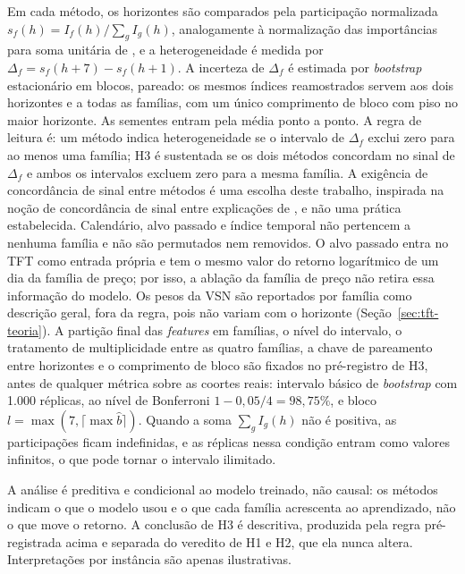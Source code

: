 Em cada método, os horizontes são comparados pela participação normalizada \(s_f(h) = I_f(h) / \sum_g I_g(h)\), analogamente à normalização das importâncias para soma unitária de , e a heterogeneidade é medida por \(\Delta_f = s_f(h+7) - s_f(h+1)\). A incerteza de \(\Delta_f\) é estimada por \textit{bootstrap} estacionário em blocos, pareado: os mesmos índices reamostrados servem aos dois horizontes e a todas as famílias, com um único comprimento de bloco com piso no maior horizonte. As sementes entram pela média ponto a ponto. A regra de leitura é: um método indica heterogeneidade se o intervalo de \(\Delta_f\) exclui zero para ao menos uma família; H3 é sustentada se os dois métodos concordam no sinal de \(\Delta_f\) e ambos os intervalos excluem zero para a mesma família. A exigência de concordância de sinal entre métodos é uma escolha deste trabalho, inspirada na noção de concordância de sinal entre explicações de , e não uma prática estabelecida. Calendário, alvo passado e índice temporal não pertencem a nenhuma família e não são permutados nem removidos. O alvo passado entra no TFT como entrada própria e tem o mesmo valor do retorno logarítmico de um dia da família de preço; por isso, a ablação da família de preço não retira essa informação do modelo. Os pesos da VSN são reportados por família como descrição geral, fora da regra, pois não variam com o horizonte (Seção~\ref{sec:tft-teoria}). A partição final das \textit{features} em famílias, o nível do intervalo, o tratamento de multiplicidade entre as quatro famílias, a chave de pareamento entre horizontes e o comprimento de bloco são fixados no pré-registro de H3, antes de qualquer métrica sobre as coortes reais: intervalo básico de \textit{bootstrap} com 1.000 réplicas, ao nível de Bonferroni \(1 - 0{,}05/4 = 98{,}75\%\), e bloco \(l = \max(7, \lceil \max \hat{b} \rceil)\). Quando a soma \(\sum_g I_g(h)\) não é positiva, as participações ficam indefinidas, e as réplicas nessa condição entram como valores infinitos, o que pode tornar o intervalo ilimitado.

A análise é preditiva e condicional ao modelo treinado, não causal: os métodos indicam o que o modelo usou e o que cada família acrescenta ao aprendizado, não o que move o retorno. A conclusão de H3 é descritiva, produzida pela regra pré-registrada acima e separada do veredito de H1 e H2, que ela nunca altera. Interpretações por instância são apenas ilustrativas.

